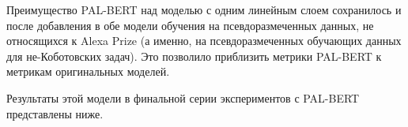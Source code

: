 Преимущество PAL-BERT над моделью с одним линейным слоем сохранилось и после добавления в обе модели обучения на псевдоразмеченных данных, не относящихся к Alexa Prize (а именно, на псевдоразмеченных обучающих данных для не-Коботовских задач). Это позволило приблизить метрики PAL-BERT к метрикам оригинальных моделей.

Результаты этой модели в финальной серии экспериментов с PAL-BERT представлены ниже.


\begin{table}[htbp]
\centering
\caption {Точность (f1) для оценки моделей в третьей серии экспериментов. Для не-Коботовских задач при оценке используются оригинальные тестовые наборы данных, для коботовских - тестовая часть разбиения данных.}
\label{mtldream:5}
\end{table}
